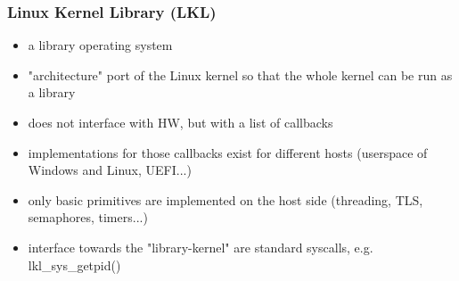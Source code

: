

\begin{frame}
    \frametitle{Linux Kernel Library (LKL)}
        \begin{itemize}
            \item a library operating system
            \item "architecture" port of the Linux kernel so that the whole kernel can be run as a library
            \item does not interface with HW, but with a list of callbacks
            \item implementations for those callbacks exist for different hosts (userspace of Windows and Linux, UEFI...)
            \item only basic primitives are implemented on the host side (threading, TLS, semaphores, timers...)
            \item interface towards the "library-kernel" are standard syscalls, e.g. lkl\_sys\_getpid()
        \end{itemize}

\end{frame}
